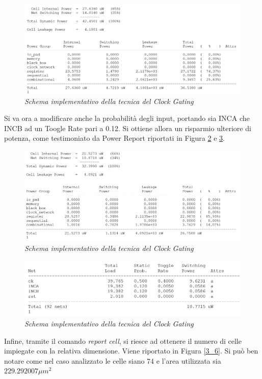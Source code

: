 {\begin{figure}[!htb]
	\centering
	\includegraphics[scale=0.8]{immagini/3_3}
	\caption{\textit{Schema implementativo della tecnica del Clock Gating}}
	\label{3_3}
\end{figure}
Si va ora a modificare anche la probabilità degli input, portando sia INCA che INCB ad un Toogle Rate pari a 0.12. Si ottiene allora un risparmio ulteriore di potenza, come testimoniato da Power Report riportati in Figura \ref{3_4} e \ref{3_5}.
\begin{figure}[!htb]
	\centering
	\includegraphics[scale=0.8]{immagini/3_4}
	\caption{\textit{Schema implementativo della tecnica del Clock Gating}}
	\label{3_4}
\end{figure}
\begin{figure}[!htb]
	\centering
	\includegraphics[scale=0.8]{immagini/3_5}
	\caption{\textit{Schema implementativo della tecnica del Clock Gating}}
	\label{3_5}
\end{figure}
\newpage
\noindent Infine, tramite il comando \textit{report cell}, si riesce ad ottenere il numero di celle impiegate con la relativa dimensione. Viene riportato in Figura \ref{3_6}. Si può ben notare come nel caso analizzato le celle siano 74 e l'area utilizzata sia $229.292007 \mu m^{2}$ \\
}
